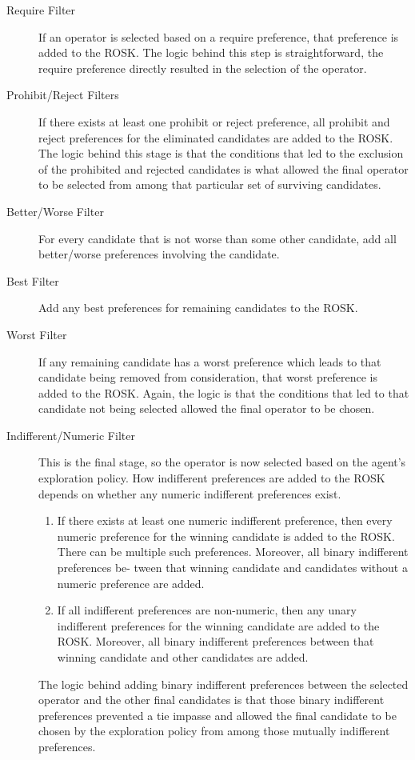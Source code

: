 \begin{description}
	\item [Require Filter]
	If an operator is selected based on a require preference, that preference is added to the ROSK. The logic behind this step is straightforward, the require preference directly resulted in the selection of the operator.
	\item [Prohibit/Reject Filters]
	If there exists at least one prohibit or reject preference, all prohibit and reject preferences for the eliminated candidates are added to the ROSK. The logic behind this stage is that the conditions that led to the exclusion of the prohibited and rejected candidates is what allowed the final operator to be selected from among that particular set of surviving candidates.
	\item [Better/Worse Filter]
	For every candidate that is not worse than some other candidate, add all better/worse preferences involving the candidate.
	\item [Best Filter]
	Add any best preferences for remaining candidates to the ROSK.
	\item [Worst Filter]
	If any remaining candidate has a worst preference which leads to that candidate being removed from consideration, that worst preference is added to the ROSK. Again, the logic is that the conditions that led to that candidate not being selected allowed the final operator to be chosen.
	\item [Indifferent/Numeric Filter]
	This is the final stage, so the operator is now selected based on the agent's exploration policy. How indifferent preferences are added to the ROSK depends on whether any numeric indifferent preferences exist.
	\begin{enumerate}
		\item If there exists at least one numeric indifferent preference, then every numeric preference for the winning candidate is added to the ROSK. There can be multiple such preferences. Moreover, all binary indifferent preferences be- tween that winning candidate and candidates without a numeric preference are added.
		\item If all indifferent preferences are non-numeric, then any unary indifferent preferences for the winning candidate are added to the ROSK. Moreover, all binary indifferent preferences between that winning candidate and other candidates are added.
	\end{enumerate}
	The logic behind adding binary indifferent preferences between the selected operator and the other final candidates is that those binary indifferent preferences prevented a tie impasse and allowed the final candidate to be chosen by the exploration policy from among those mutually indifferent preferences.
\end{description}

